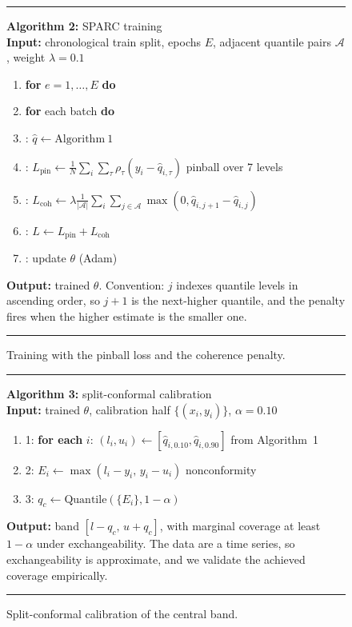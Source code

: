 \documentclass[twoside]{article}
\begin{document}
\begin{figure}[t]
\centering
\begin{minipage}{\linewidth}
\hrule\vspace{2pt}
\textbf{Algorithm 2:} SPARC training\\
\small
\textbf{Input:} chronological train split, epochs $E$, adjacent quantile pairs $\mathcal{A}$, weight $\lambda = 0.1$\\
\begin{enumerate}\setlength\itemsep{0pt}
\item \textbf{for} $e = 1,\dots,E$ \textbf{do}\hfill
\item \quad \textbf{for} each batch \textbf{do}\hfill
\item \quad{}: $\hat q \gets \mathrm{Algorithm~1}$
\item \quad{}: $L_{\mathrm{pin}} \gets \frac{1}{N}\sum_i \sum_{\tau} \rho_\tau(y_i - \hat q_{i,\tau})$ \hfill pinball over 7 levels
\item \quad{}: $L_{\mathrm{coh}} \gets \lambda \frac{1}{|\mathcal{A}|}\sum_i \sum_{j \in \mathcal{A}} \max(0, \hat q_{i,j+1} - \hat q_{i,j})$
\item \quad{}: $L \gets L_{\mathrm{pin}} + L_{\mathrm{coh}}$
\item \quad{}: update $\theta$ (Adam)
\end{enumerate}
\textbf{Output:} trained $\theta$. Convention: $j$ indexes quantile levels in ascending order, so $j+1$ is the next-higher quantile, and the penalty fires when the higher estimate is the smaller one.
\vspace{2pt}\hrule
\end{minipage}
\caption{Training with the pinball loss and the coherence penalty.}
\label{alg:training}
\end{figure}

\begin{figure}[t]
\centering
\begin{minipage}{\linewidth}
\hrule\vspace{2pt}
\textbf{Algorithm 3:} split-conformal calibration\\
\small
\textbf{Input:} trained $\theta$, calibration half $\{(x_i, y_i)\}$, $\alpha = 0.10$\\
\begin{enumerate}\setlength\itemsep{0pt}
\item 1: \textbf{for each} $i$: $(l_i, u_i) \gets [\hat q_{i,0.10}, \hat q_{i,0.90}]$ from Algorithm~1
\item 2: $E_i \gets \max(l_i - y_i,\, y_i - u_i)$ \hfill nonconformity
\item 3: $q_c \gets \mathrm{Quantile}(\{E_i\}, 1 - \alpha)$
\end{enumerate}
\textbf{Output:} band $[l - q_c,\, u + q_c]$, with marginal coverage at least $1-\alpha$ under exchangeability. The data are a time series, so exchangeability is approximate, and we validate the achieved coverage empirically.
\vspace{2pt}\hrule
\end{minipage}
\caption{Split-conformal calibration of the central band.}
\label{alg:calibration}
\end{figure}


\end{document}

